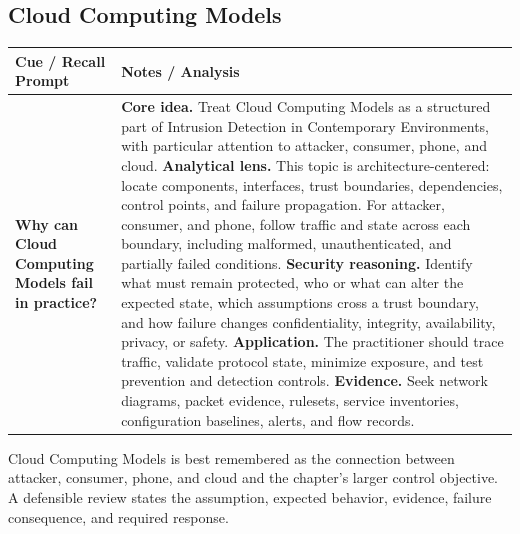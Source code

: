 \documentclass[11pt]{article}
\newcommand{\CornellHeader}{%
\rowcolor{Navy}\color{white}\bfseries Cue / Recall Prompt & \color{white}\bfseries Notes / Analysis\\\hline}
\newcommand{\CornellRow}[2]{%
\cellcolor{CueGray}\RaggedRight\textbf{#1} & \RaggedRight #2\\\hline}
\begin{document}
\subsection*{Cloud Computing Models}
\begin{longtable}{>{\RaggedRight\arraybackslash}p{}|>{\RaggedRight\arraybackslash}p{}}
\CornellHeader
\CornellRow{Why can Cloud Computing Models fail in practice?}{\textbf{Core idea.} Treat Cloud Computing Models as a structured part of Intrusion Detection in Contemporary Environments, with particular attention to attacker, consumer, phone, and cloud. \textbf{Analytical lens.} This topic is architecture-centered: locate components, interfaces, trust boundaries, dependencies, control points, and failure propagation. For attacker, consumer, and phone, follow traffic and state across each boundary, including malformed, unauthenticated, and partially failed conditions. \textbf{Security reasoning.} Identify what must remain protected, who or what can alter the expected state, which assumptions cross a trust boundary, and how failure changes confidentiality, integrity, availability, privacy, or safety. \textbf{Application.} The practitioner should trace traffic, validate protocol state, minimize exposure, and test prevention and detection controls. \textbf{Evidence.} Seek network diagrams, packet evidence, rulesets, service inventories, configuration baselines, alerts, and flow records.}
\end{longtable}
\begin{topicsummary}
Cloud Computing Models is best remembered as the connection between attacker, consumer, phone, and cloud and the chapter's larger control objective. A defensible review states the assumption, expected behavior, evidence, failure consequence, and required response.
\end{topicsummary}
\end{document}
